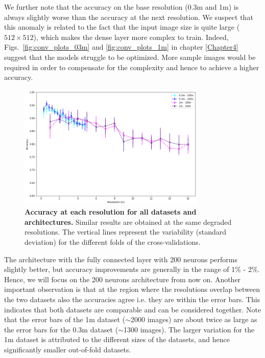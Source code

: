 We further note that the accuracy on the base resolution (0.3m and 1m) is always slightly worse than the accuracy at the next resolution. We suspect that this anomaly is related to the fact that the input image size is quite large ($512\times512$), which makes the dense layer more complex to train. Indeed, Figs.~\ref{fig:conv_plots_03m} and \ref{fig:conv_plots_1m} in chapter \ref{Chapter4} suggest that the models struggle to be optimized. More sample images would be required in order to compensate for the complexity and hence to achieve a higher accuracy.

\begin{figure}[h!]
	\centering
	\includegraphics[width=0.8\textwidth]{Figures/results/acc_res_03m_1m.png}
	\captionsetup{width=1\linewidth}
	\caption{\textbf{Accuracy at each resolution for all datasets and architectures.} Similar results are obtained at the same degraded resolutions. The vertical lines represent the variability (standard deviation) for the different folds of the cross-validations.}
	\label{fig:acc_res_03m_1m}
\end{figure}

The architecture with the fully connected layer with 200 neurons performs slightly better, but accuracy improvements are generally in the range of 1\% - 2\%. Hence, we will focus on the 200 neurons architecture from now on. Another important observation is that at the region where the resolutions overlap between the two datasets also the accuracies agree i.e. they are within the error bars. This indicates that both datasets are comparable and can be considered together.
Note that the error bars of the 1m dataset ($\sim$2000 images) are about twice as large as the error bars for the 0.3m dataset ($\sim$1300 images). The larger variation for the 1m dataset is attributed to the different sizes of the datasets, and hence significantly smaller out-of-fold datasets.

